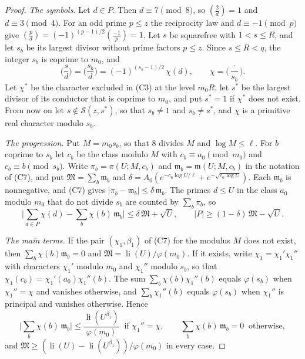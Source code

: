 \documentclass[11pt,letterpaper]{article}
\numberwithin{equation}{section}
\begin{document}
\begin{proof}
\emph{The symbols.} Let $d\in P$. Then $d\equiv7\pmod8$, so $(\tfrac2d)=1$ and $d\equiv3\pmod4$. For an odd prime $p\le z$ the reciprocity law and $d\equiv-1\pmod p$ give $(\tfrac pd)=(-1)^{(p-1)/2}(\tfrac{-1}p)=1$. Let $s$ be squarefree with $1<s\le R$, and let $s_b$ be its largest divisor without prime factors $p\le z$. Since $s\le R<q$, the integer $s_b$ is coprime to $m_0$, and
\[
\Big(\frac sd\Big)=\Big(\frac{s_b}d\Big)=(-1)^{(s_b-1)/2}\,\chi(d),\qquad\chi=\Big(\frac{\cdot}{s_b}\Big).
\]
Let $\chi^\ast$ be the character excluded in (C3) at the level $m_0R$, let $s^\ast$ be the largest divisor of its conductor that is coprime to $m_0$, and put $s^\ast=1$ if $\chi^\ast$ does not exist. From now on let $s\notin\mathcal S(z,s^\ast)$, so that $s_b\ne1$ and $s_b\ne s^\ast$, and $\chi$ is a primitive real character modulo $s_b$.

\emph{The progression.} Put $M=m_0s_b$, so that $8$ divides $M$ and $\log M\le\ell$. For $b$ coprime to $s_b$ let $c_b$ be the class modulo $M$ with $c_b\equiv a_0\pmod{m_0}$ and $c_b\equiv b\pmod{s_b}$. Write $\pi_b=\pi(U;M,c_b)$ and $\mathfrak m_b=\mathfrak m(U;M,c_b)$ in the notation of (C7), and put $\mathfrak M=\sum_b\mathfrak m_b$ and $\delta=A_0(e^{-c_6\log U/\ell}+e^{-\sqrt{c_6\log U}})$. Each $\mathfrak m_b$ is nonnegative, and (C7) gives $|\pi_b-\mathfrak m_b|\le\delta\,\mathfrak m_b$. The primes $d\le U$ in the class $a_0$ modulo $m_0$ that do not divide $s_b$ are counted by $\sum_b\pi_b$, so
\begin{equation}\label{st2a}
\Big|\sum_{d\in P}\chi(d)-\sum_b\chi(b)\,\mathfrak m_b\Big|\le\delta\,\mathfrak M+\sqrt U,\qquad|P|\ge(1-\delta)\,\mathfrak M-\sqrt U .
\end{equation}

\emph{The main terms.} If the pair $(\chi_1,\beta_1)$ of (C7) for the modulus $M$ does not exist, then $\sum_b\chi(b)\mathfrak m_b=0$ and $\mathfrak M=\operatorname{li}(U)/\varphi(m_0)$. If it exists, write $\chi_1=\chi_1'\chi_1''$ with characters $\chi_1'$ modulo $m_0$ and $\chi_1''$ modulo $s_b$, so that $\chi_1(c_b)=\chi_1'(a_0)\chi_1''(b)$. The sum $\sum_b\chi(b)\chi_1''(b)$ equals $\varphi(s_b)$ when $\chi_1''=\chi$ and vanishes otherwise, and $\sum_b\chi_1''(b)$ equals $\varphi(s_b)$ when $\chi_1''$ is principal and vanishes otherwise. Hence
\begin{equation}\label{st2b}
\Big|\sum_b\chi(b)\,\mathfrak m_b\Big|\le\frac{\operatorname{li}(U^{\beta_1})}{\varphi(m_0)}\ \text{ if }\chi_1''=\chi,\qquad\sum_b\chi(b)\,\mathfrak m_b=0\ \text{ otherwise},
\end{equation}
and $\mathfrak M\ge(\operatorname{li}(U)-\operatorname{li}(U^{\beta_1}))/\varphi(m_0)$ in every case.


\end{proof}
\end{document}
